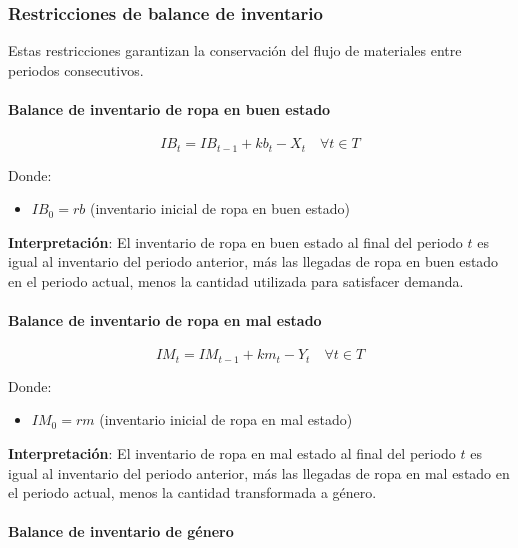 \subsubsection*{Restricciones de balance de inventario}

Estas restricciones garantizan la conservación del flujo de materiales entre periodos consecutivos.

\paragraph{Balance de inventario de ropa en buen estado}

\begin{equation}
IB_t = IB_{t-1} + kb_t - X_t \quad \forall t \in T
\end{equation}

Donde:
\begin{itemize}
    \item $IB_0 = rb$ (inventario inicial de ropa en buen estado)
\end{itemize}

\textbf{Interpretación}: El inventario de ropa en buen estado al final del periodo $t$ es igual al inventario del periodo anterior, más las llegadas de ropa en buen estado en el periodo actual, menos la cantidad utilizada para satisfacer demanda.

\paragraph{Balance de inventario de ropa en mal estado}

\begin{equation}
IM_t = IM_{t-1} + km_t - Y_t \quad \forall t \in T
\end{equation}

Donde:
\begin{itemize}
    \item $IM_0 = rm$ (inventario inicial de ropa en mal estado)
\end{itemize}

\textbf{Interpretación}: El inventario de ropa en mal estado al final del periodo $t$ es igual al inventario del periodo anterior, más las llegadas de ropa en mal estado en el periodo actual, menos la cantidad transformada a género.

\paragraph{Balance de inventario de género}


